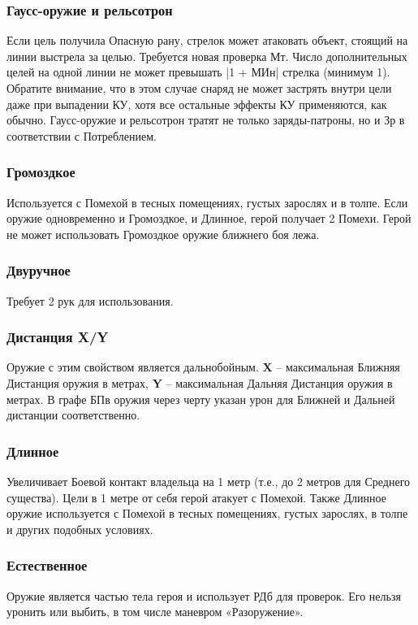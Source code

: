 \subsubsection{Гаусс-оружие и рельсотрон} Если цель получила Опасную рану, стрелок может атаковать объект, стоящий на линии выстрела за целью. Требуется новая проверка Мт. Число дополнительных целей на одной линии не может превышать |1 + МИн| стрелка (минимум 1). Обратите внимание, что в этом случае снаряд не может застрять внутри цели даже при выпадении КУ, хотя все остальные эффекты КУ применяются, как обычно.
\newline *Гаусс-оружие и рельсотрон тратят не только заряды-патроны, но и Зр в соответствии с Потреблением.
\subsubsection{Громоздкое} Используется с Помехой в тесных помещениях, густых зарослях и в толпе. Если оружие одновременно и Громоздкое, и Длинное, герой получает 2 Помехи. Герой не может использовать Громоздкое оружие ближнего боя лежа.
\subsubsection{Двуручное} Требует 2 рук для использования.
\subsubsection{Дистанция X/Y} Оружие с этим свойством является дальнобойным. \textbf{X} – максимальная Ближняя Дистанция оружия в метрах, \textbf{Y} – максимальная Дальняя Дистанция оружия в метрах. В графе БПв оружия через черту указан урон для Ближней и Дальней дистанции соответственно.
\subsubsection{Длинное} Увеличивает Боевой контакт владельца на 1 метр (т.е., до 2 метров для Среднего существа). Цели в 1 метре от себя герой атакует с Помехой. Также Длинное оружие используется с Помехой в тесных помещениях, густых зарослях, в толпе и других подобных условиях.
\subsubsection{Естественное} Оружие является частью тела героя и использует РДб для проверок. Его нельзя уронить или выбить, в том числе маневром «Разоружение».
